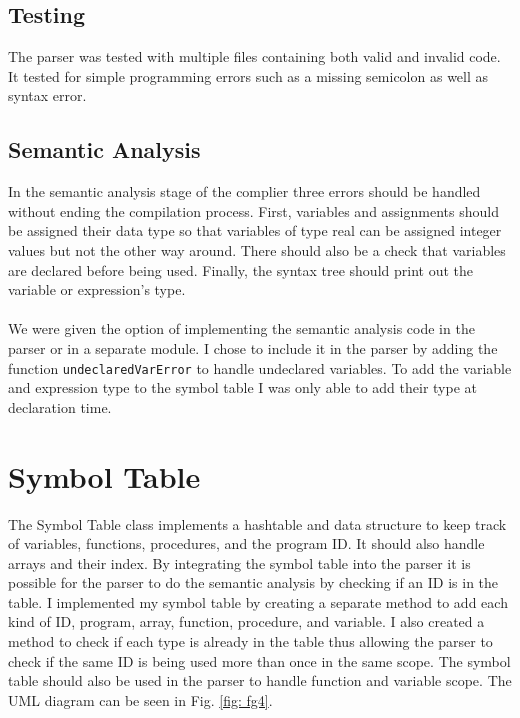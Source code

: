 \documentclass[10]{article}
\begin{document}
\subsection{Testing}
The parser was tested with multiple files containing both valid and invalid code. It tested for simple programming errors such as a missing semicolon as well as syntax error.  

\subsection{Semantic Analysis}
In the semantic analysis stage of the complier three errors should be handled without ending the compilation process. First, variables and assignments should be assigned their data type so that variables of type real can be assigned integer values but not the other way around. There should also be a check that variables are declared before being used. Finally, the syntax tree should print out the variable or expression's type.

\paragraph{}
We were given the option of implementing the semantic analysis code in the parser or in a separate module. I chose to include it in the parser by adding the function \verb|undeclaredVarError| to handle undeclared variables. To add the variable and expression type to the symbol table I was only able to add their type at declaration time. 


\section{Symbol Table}
The Symbol Table class implements a hashtable and data structure to keep track of variables, functions, procedures, and the program ID. It should also handle arrays and their index. By integrating the symbol table into the parser it is possible for the parser to do the semantic analysis by checking if an ID is in the table. I implemented my symbol table by creating a separate method to add each kind of ID, program, array, function, procedure, and variable. I also created a method to check if each type is already in the table thus allowing the parser to check if the same ID is being used more than once in the same scope. The symbol table should also be used in the parser to handle function and variable scope. The UML diagram can be seen in Fig. \ref{fig: fg4}.
\end{document}
